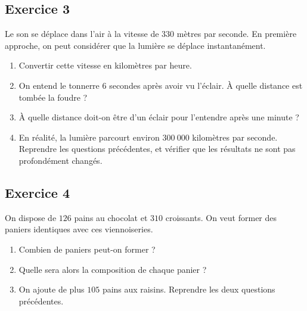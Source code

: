 \documentclass[14 pt]{extarticle}
\theoremstyle{plain}
\begin{document}
 
\subsection*{Exercice 3} 

Le son se déplace dans l'air à la vitesse de $330$ mètres par seconde. En première approche, on peut considérer que la lumière se déplace instantanément. 
\begin{enumerate}
\item Convertir cette vitesse en kilomètres par heure. 
\item On entend le tonnerre $6$ secondes après avoir vu l'éclair. À quelle distance est tombée la foudre ? 
\item À quelle distance doit-on être d'un éclair pour l'entendre après une minute ? 
\item En réalité, la lumière parcourt environ $300\ 000$ kilomètres par seconde. Reprendre les questions précédentes, 
et vérifier que les résultats ne sont pas profondément changés. 
\end{enumerate}


\subsection*{Exercice 4}

On dispose de $126$ pains au chocolat et $310$ croissants. On veut former des paniers identiques avec ces viennoiseries. 

\begin{enumerate}
\item Combien de paniers peut-on former ? 
\item Quelle sera alors la composition de chaque panier ? 
\item On ajoute de plus $105$ pains aux raisins. Reprendre les deux questions précédentes. 
\end{enumerate}




 	
\end{document}
